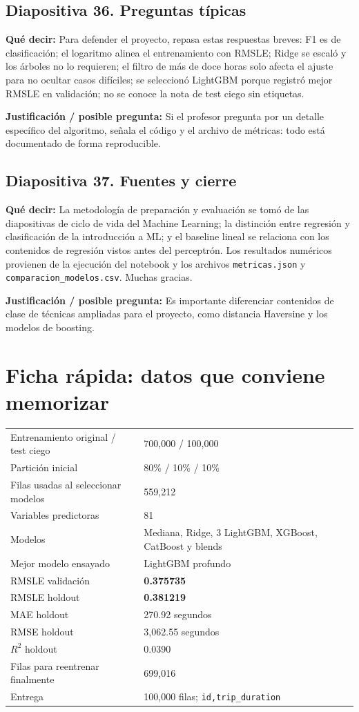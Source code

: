 \documentclass[11pt,letterpaper]{article}
\newcommand{\lamina}[2]{\subsection*{Diapositiva #1. #2}}
\newcommand{\explica}[1]{\noindent\textcolor{azul}{\textbf{Qué decir:}} #1\par\smallskip}
\newcommand{\defiende}[1]{\noindent\textcolor{verde}{\textbf{Justificación / posible pregunta:}} #1\par\medskip}
\begin{document}
\lamina{36}{Preguntas típicas}
\explica{Para defender el proyecto, repasa estas respuestas breves: F1 es de clasificación; el logaritmo alinea el entrenamiento con RMSLE; Ridge se escaló y los árboles no lo requieren; el filtro de más de doce horas solo afecta el ajuste para no ocultar casos difíciles; se seleccionó LightGBM porque registró mejor RMSLE en validación; no se conoce la nota de test ciego sin etiquetas.}
\defiende{Si el profesor pregunta por un detalle específico del algoritmo, señala el código y el archivo de métricas: todo está documentado de forma reproducible.}

\lamina{37}{Fuentes y cierre}
\explica{La metodología de preparación y evaluación se tomó de las diapositivas de ciclo de vida del Machine Learning; la distinción entre regresión y clasificación de la introducción a ML; y el baseline lineal se relaciona con los contenidos de regresión vistos antes del perceptrón. Los resultados numéricos provienen de la ejecución del notebook y los archivos \texttt{metricas.json} y \texttt{comparacion\_modelos.csv}. Muchas gracias.}
\defiende{Es importante diferenciar contenidos de clase de técnicas ampliadas para el proyecto, como distancia Haversine y los modelos de boosting.}

\section*{Ficha rápida: datos que conviene memorizar}
\begin{center}
\begin{tabular}{p{.52\linewidth}p{.37\linewidth}}\toprule
Entrenamiento original / test ciego & 700,000 / 100,000\\
Partición inicial & 80\% / 10\% / 10\%\\
Filas usadas al seleccionar modelos & 559,212\\
Variables predictoras & 81\\
Modelos & Mediana, Ridge, 3 LightGBM, XGBoost, CatBoost y blends\\
Mejor modelo ensayado & LightGBM profundo\\
RMSLE validación & \textbf{0.375735}\\
RMSLE holdout & \textbf{0.381219}\\
MAE holdout & 270.92 segundos\\
RMSE holdout & 3,062.55 segundos\\
$R^2$ holdout & 0.0390\\
Filas para reentrenar finalmente & 699,016\\
Entrega & 100,000 filas; \texttt{id,trip\_duration}\\\bottomrule
\end{tabular}
\end{center}
\end{document}
